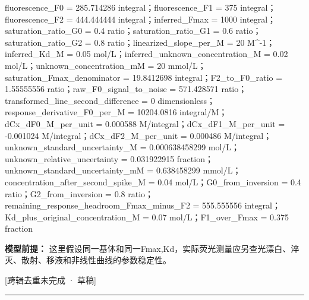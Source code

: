 \documentclass[UTF8,11pt,a4paper]{ctexart}
\begin{document}
fluorescence\_F0 = 285.714286 integral；fluorescence\_F1 = 375 integral；fluorescence\_F2 = 444.444444 integral；inferred\_Fmax = 1000 integral；saturation\_ratio\_G0 = 0.4 ratio；saturation\_ratio\_G1 = 0.6 ratio；saturation\_ratio\_G2 = 0.8 ratio；linearized\_slope\_per\_M = 20 M\textasciicircum{}-1；inferred\_Kd\_M = 0.05 mol/L；inferred\_unknown\_concentration\_M = 0.02 mol/L；unknown\_concentration\_mM = 20 mmol/L；saturation\_Fmax\_denominator = 19.8412698 integral；F2\_to\_F0\_ratio = 1.55555556 ratio；raw\_F0\_signal\_to\_noise = 571.428571 ratio；transformed\_line\_second\_difference = 0 dimensionless；response\_derivative\_F0\_per\_M = 10204.0816 integral/M；dCx\_dF0\_M\_per\_unit = 0.000588 M/integral；dCx\_dF1\_M\_per\_unit = -0.001024 M/integral；dCx\_dF2\_M\_per\_unit = 0.000486 M/integral；unknown\_standard\_uncertainty\_M = 0.000638458299 mol/L；unknown\_relative\_uncertainty = 0.031922915 fraction；unknown\_standard\_uncertainty\_mM = 0.638458299 mmol/L；concentration\_after\_second\_spike\_M = 0.04 mol/L；G0\_from\_inversion = 0.4 ratio；G2\_from\_inversion = 0.8 ratio；remaining\_response\_headroom\_Fmax\_minus\_F2 = 555.555556 integral；Kd\_plus\_original\_concentration\_M = 0.07 mol/L；F1\_over\_Fmax = 0.375 fraction\par
\noindent\textbf{模型前提：}
这里假设同一基体和同一Fmax,Kd，实际荧光测量应另查光漂白、淬灭、散射、移液和非线性曲线的参数稳定性。\par
\noindent\textcolor{red!65!black}{[跨辑去重未完成 · 草稿]} \par
\medskip\hrule\medskip
{}
\end{document}
